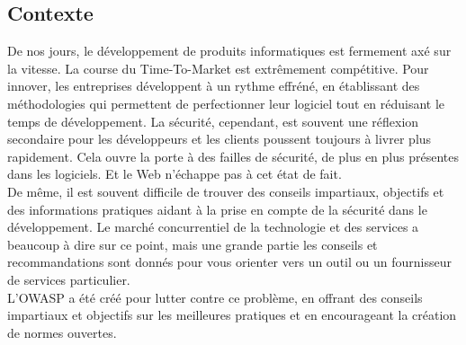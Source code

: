 \subsection{Contexte}
De nos jours, le développement de produits informatiques est fermement axé sur la vitesse. La course du Time-To-Market est extrêmement compétitive. Pour innover, les entreprises développent à un rythme effréné, en établissant des méthodologies qui permettent de perfectionner leur logiciel tout en réduisant le temps de développement. La sécurité, cependant, est souvent une réflexion secondaire pour les développeurs et les clients poussent toujours à livrer plus rapidement. Cela ouvre la porte à des failles de sécurité, de plus en plus présentes dans les logiciels. Et le Web n’échappe pas à cet état de fait.\\ 
De même, il est souvent difficile de trouver des conseils impartiaux, objectifs et des informations pratiques aidant à la prise en compte de la sécurité dans le développement. Le marché concurrentiel de la technologie et des services a beaucoup à dire sur ce point, mais une grande partie les conseils et recommandations sont donnés pour vous orienter vers un outil ou un fournisseur de services particulier.\\
L'OWASP a été créé pour lutter contre ce problème, en offrant des conseils impartiaux et objectifs sur les meilleures pratiques et en encourageant la création de normes ouvertes.
